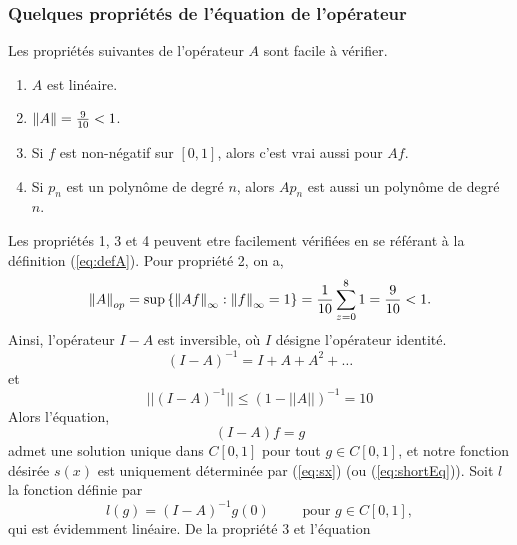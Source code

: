 \subsubsection{Quelques propri\'et\'es de l'\'equation de l'op\'erateur}
\noindent Les propri\'et\'es suivantes de l'op\'erateur $A$ sont facile \`a
v\'erifier.
\begin{enumerate}
	\item $A$ est lin\'eaire.
	\item $\left\lVert A\right\rVert = \frac{9}{10} < 1$.
	\item Si $f$ est non-n\'egatif sur $[0,1]$, alors c'est vrai aussi pour
		$Af$.
	\item Si $p_{n}$ est un polyn\^{o}me de degr\'e $n$, alors $Ap_{n}$ est aussi
		un polyn\^{o}me de degr\'e $n$.
\end{enumerate}
Les propri\'et\'es 1, 3 et 4 peuvent etre facilement v\'erifi\'ees en se
r\'ef\'erant \`a la d\'efinition (\ref{eq:defA}). Pour propri\'et\'e 2, on a,
\[
	\left\lVert A\right\rVert_{op} = \sup \left\{\left\lVert Af\right\rVert_{\infty} : \left\lVert f\right\rVert_{\infty} =
	1\right\} = \frac{1}{10} \sum_{z=0}^{8}1 = \frac{9}{10} < 1.
\]
Ainsi, l'op\'erateur $I-A$ est inversible, o\`u $I$ d\'esigne l'op\'erateur
identit\'e.
\begin{equation}
	(I-A)^{-1} = I + A + A^{2} + \ldots 
	\label{eq:IminAinv}
\end{equation}
et
\[ ||(I-A)^{-1}|| \le (1-||A||)^{-1} = 10 \]
Alors l'\'equation,
\[ (I-A)f = g \]
admet une solution unique dans $C[0,1]$ pour tout $g\in C[0,1]$, et notre
fonction d\'esir\'ee $s(x)$ est uniquement d\'etermin\'ee par (\ref{eq:sx}) (ou
(\ref{eq:shortEq})). Soit $l$ la fonction d\'efinie par
\[ l(g) = (I-A)^{-1}g(0) \qquad \text{ pour } g\in C[0,1], \]
qui est \'evidemment lin\'eaire. De la propri\'et\'e 3 et l'\'equation
